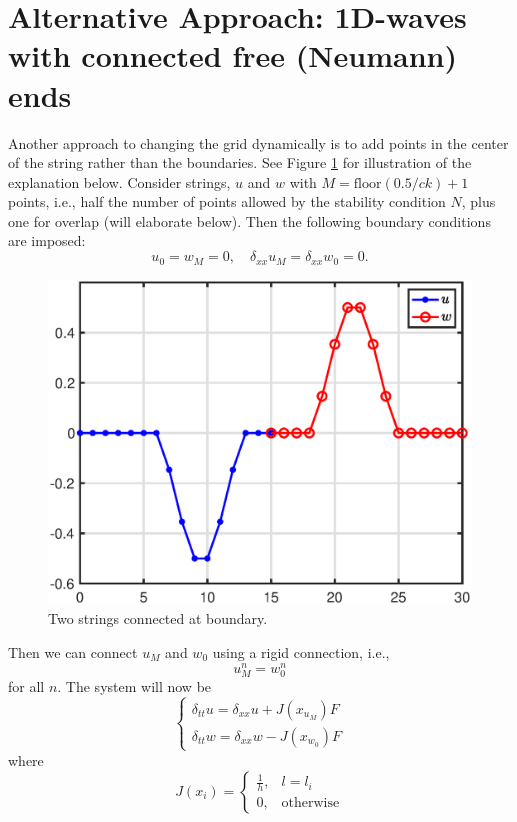 \documentclass[dvipsnames]{article}
\begin{document}
\section{Alternative Approach: 1D-waves with connected free (Neumann) ends}
Another approach to changing the grid dynamically is to add points in the center of the string rather than the boundaries. See Figure \ref{fig:twoFreeStrings} for illustration of the explanation below. Consider strings, $u$ and $w$ with $M = \text{floor}(0.5/ck) + 1$ points, i.e., half the number of points allowed by the stability condition $N$, plus one for overlap (will elaborate below). Then the following boundary conditions are imposed:
\begin{equation}\label{eq:halfStringBoundaryCond}
    u_0 = w_M = 0, \quad \delta_{xx}u_M = \delta_{xx}w_0 = 0.
\end{equation}
%
\begin{figure}[h]
\centerline{\includegraphics[width=0.6\columnwidth]{twoFreeStrings.eps} }
\caption{\label{fig:twoFreeStrings}{Two strings connected at boundary.}}
\end{figure}
%
Then we can connect $u_M$ and $w_0$ using a rigid connection, i.e.,
\begin{equation}\label{eq:rigid}
    u_M^n = w_0^n
\end{equation}
for all $n$. The system will now be
\begin{equation}
    \begin{cases}\label{eq:systemHalfStrings}
        \delta_{tt}u = \delta_{xx}u + J(x_{u_M})F\\
        \delta_{tt}w = \delta_{xx}w - J(x_{w_0})F
    \end{cases}
\end{equation}
where
\begin{equation}
    J(x_i) =
    \begin{cases}
        \frac{1}{h}, & l = l_i\\
        0,& \text{otherwise}
    \end{cases}
\end{equation}
\end{document}
